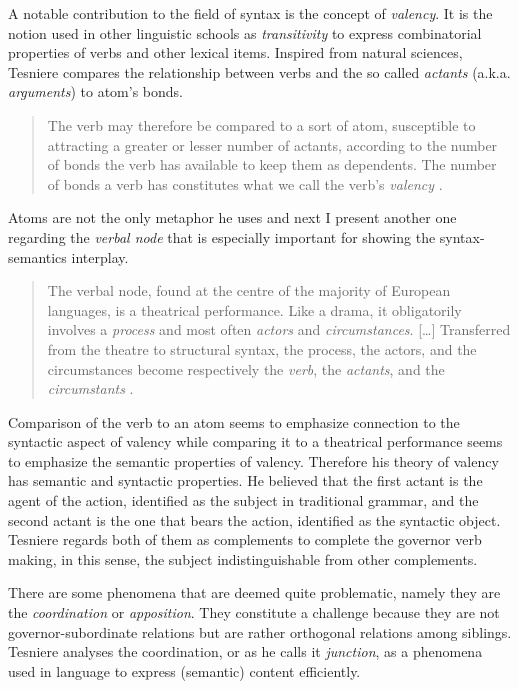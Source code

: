 A notable contribution to the field of syntax is the concept of \textit{valency}. It is the notion used in other linguistic schools as \textit{transitivity} to express combinatorial properties of verbs and other lexical items. Inspired from natural sciences, Tesniere compares the relationship between verbs and the so called \textit{actants} (a.k.a. \textit{arguments}) to atom's bonds. 

\begin{quotation}
    The verb may therefore be compared to a sort of atom, susceptible to attracting a greater or lesser number of actants, according to the number of bonds the verb has available to keep them as dependents. The number of bonds a verb has constitutes what we call the verb’s \textit{valency} \citep[241]{Tesniere2015}.
\end{quotation}

Atoms are not the only metaphor he uses and next I present another one regarding the \textit{verbal node} that is especially important for showing the syntax-semantics interplay. 

\begin{quotation}
     The verbal node, found at the centre of the majority of European languages, is a theatrical performance. Like a drama, it obligatorily involves a \textit{process} and most often \textit{actors} and \textit{circumstances}. [\dots] Transferred from the theatre to structural syntax, the process, the actors, and the circumstances become respectively the \textit{verb}, the \textit{actants}, and the \textit{circumstants} \citep[97]{Tesniere2015}.
\end{quotation}

Comparison of the verb to an atom seems to emphasize connection to the syntactic aspect of valency while comparing it to a theatrical performance seems to emphasize the semantic properties of valency. Therefore his theory of valency has semantic and syntactic properties. He believed that the first actant is the agent of the action, identified as the subject in traditional grammar, and the second actant is the one that bears the action, identified as the syntactic object. Tesniere regards both of them as complements to complete the governor verb making, in this sense, the subject indistinguishable from other complements. 

There are some phenomena that are deemed quite problematic, namely they are the \textit{coordination} or \textit{apposition}. They constitute a challenge because they are not governor-subordinate relations but are rather orthogonal relations among siblings. Tesniere analyses the coordination, or as he calls it \textit{junction}, as a phenomena used in language to express (semantic) content efficiently. 

